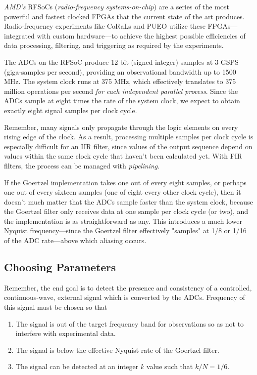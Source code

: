 \documentclass[reprint,amsmath,amssymb]{revtex4-2}
\begin{document}
\textit{AMD's} RFSoCs (\textit{radio-frequency systems-on-chip}) are a series of the most powerful and fastest clocked FPGAs that the current state of the art produces. Radio-frequency experiments like CoRaLs and PUEO utilize these FPGAs---integrated with custom hardware---to achieve the highest possible efficiencies of data processing, filtering, and triggering as required by the experiments. 

The ADCs on the RFSoC produce 12-bit (signed integer) samples at 3 GSPS (giga-samples per second), providing an observational bandwidth up to 1500 MHz. The system clock runs at 375 MHz, which effectively translates to 375 million operations per second \textit{for each independent parallel process}. Since the ADCs sample at eight times the rate of the system clock, we expect to obtain exactly eight signal samples per clock cycle.

Remember, many signals only propagate through the logic elements on every rising edge of the clock. As a result, processing multiple samples per clock cycle is especially difficult for an IIR filter, since values of the output sequence depend on values within the same clock cycle that haven't been calculated yet. With FIR filters, the process can be managed with \textit{pipelining}.

If the Goertzel implementation takes one out of every eight samples, or perhaps one out of every sixteen samples (one of eight every other clock cycle), then it doesn't much matter that the ADCs sample faster than the system clock, because the Goertzel filter only receives data at one sample per clock cycle (or two), and the implementation is as straightforward as any. This introduces a much lower Nyquist frequency---since the Goertzel filter effectively "samples" at 1/8 or 1/16 of the ADC rate---above which aliasing occurs.

\subsection{Choosing Parameters}

Remember, the end goal is to detect the presence and consistency of a controlled, continuous-wave, external signal which is converted by the ADCs. Frequency of this signal must be chosen so that 
\begin{enumerate}
    \item The signal is out of the target frequency band for observations so as not to interfere with experimental data.
    \item The signal is below the effective Nyquist rate of the Goertzel filter.
    \item The signal can be detected at an integer $k$ value such that $k/N = 1/6$. 
\end{enumerate}
\end{document}
